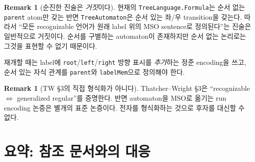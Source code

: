\documentclass[11pt]{article}
\theoremstyle{definition}
\newtheorem{remark}[definition]{Remark}
\theoremstyle{plain}
\newcommand{\MSO}{\mathrm{MSO}}
\newcommand{\lean}[1]{\texttt{#1}}
\newcommand{\TW}{Thatcher--Wright}
\begin{document}
\begin{remark}[순진한 진술은 \emph{거짓}이다]
\label{aut:rem:conversefalse}
현재의 \lean{TreeLanguage.Formula}는 순서 없는 \lean{parent} atom만 갖는 반면
\lean{TreeAutomaton}은 순서 있는 좌/우 transition을 갖는다. 따라서
``모든 recognizable 언어가 원래 label 위의 $\MSO$ sentence로 정의된다''는
진술은 일반적으로 거짓이다. 순서를 구별하는 automaton이 존재하지만 순서 없는
논리로는 그것을 표현할 수 없기 때문이다.

재개할 때는 label에 \lean{root}/\lean{left}/\lean{right} 방향 표시를
\emph{추가}하는 정준 encoding을 쓰고, 순서 있는 자식 관계를 \lean{parent}와
\lean{labelMem}으로 정의해야 한다.
\end{remark}

\begin{remark}[TW \S3의 직접 형식화가 아니다]
\TW{} \S3은 ``recognizable $\iff$ generalized regular''를 증명한다. 반면
automaton을 $\MSO$로 옮기는 run encoding 논증은 별개의 표준 논증이다.
전자를 형식화하는 것으로 후자를 대신할 수 없다.
\end{remark}

\section{요약: 참조 문서와의 대응}
\label{aut:sec:summary}
\end{document}
